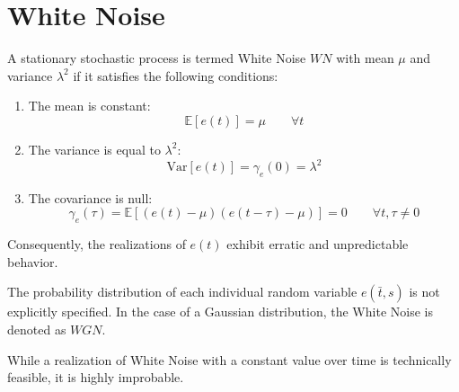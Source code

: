 \section{ White Noise}

\begin{definition}
    A stationary stochastic process is termed White Noise $WN$ with mean $\mu$ and variance $\lambda^2$ if it satisfies the following conditions:
\end{definition}
\begin{enumerate}
    \item The mean is constant: 
        \[\mathbb{E}\left[e(t)\right]=\mu \qquad \forall t\]
    \item The variance is equal to $\lambda^2$: 
        \[\text{Var}\left[e(t)\right]=\gamma_e(0)=\lambda^2\]
    \item The covariance is null: 
        \[\gamma_e(\tau)=\mathbb{E}\left[ \left(e(t)-\mu\right)\left(e(t-\tau)-\mu\right) \right]=0 \qquad \forall t,\tau \neq 0\] 
\end{enumerate}
Consequently, the realizations of $e(t)$ exhibit erratic and unpredictable behavior.

The probability distribution of each individual random variable $e(\bar{t},s)$ is not explicitly specified.
In the case of a Gaussian distribution, the  White Noise is denoted as $WGN$.

While a realization of  White Noise with a constant value over time is technically feasible, it is highly improbable.